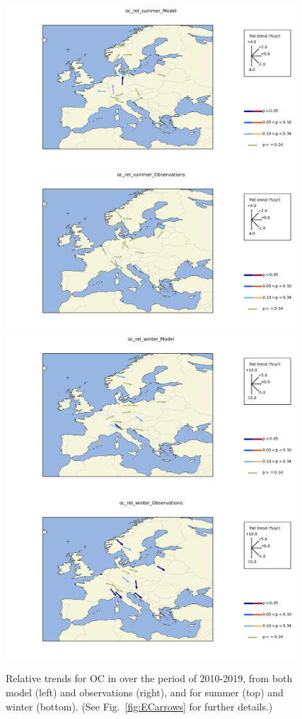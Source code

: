
\begin{figure}
\includegraphics*[height=6cm,trim=3cm 0 0 0 0]{FIGS_TRENDS/Plot_oc_rel_summer_Model.png}%
\includegraphics*[height=6cm,trim=3cm 0 6.9cm 0]{FIGS_TRENDS/Plot_oc_rel_summer_Observations.png}
\\
\includegraphics*[height=6cm,trim=3cm 0 0 0]{FIGS_TRENDS/Plot_oc_rel_winter_Model.png}%
\includegraphics*[height=6cm,trim=3cm 0 6.9cm 0]{FIGS_TRENDS/Plot_oc_rel_winter_Observations.png}
\caption{Relative trends for OC in \pmfine over the period of 2010-2019, from both model (left) and observations (right), and for summer (top) and winter (bottom). (See Fig.~\ref{fig:ECarrows} for further details.)
 \label{fig:OCarrows}}
\end{figure}

